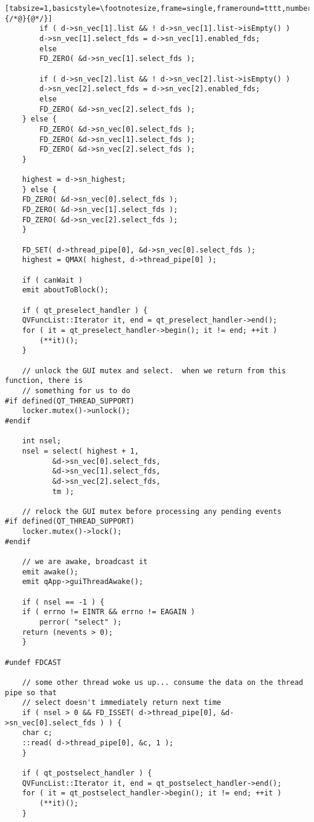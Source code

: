 \begin{enumerate}
\begin{lstlisting}[tabsize=1,basicstyle=\footnotesize,frame=single,frameround=tttt,numbers=left,breaklines=true,title=\$QTDIR/src/kernel/qeventloop\_{}qws.cpp,escapeinside={/*@}{@*/}]
	    if ( d->sn_vec[1].list && ! d->sn_vec[1].list->isEmpty() )
		d->sn_vec[1].select_fds = d->sn_vec[1].enabled_fds;
	    else
		FD_ZERO( &d->sn_vec[1].select_fds );

	    if ( d->sn_vec[2].list && ! d->sn_vec[2].list->isEmpty() )
		d->sn_vec[2].select_fds = d->sn_vec[2].enabled_fds;
	    else
		FD_ZERO( &d->sn_vec[2].select_fds );
	} else {
	    FD_ZERO( &d->sn_vec[0].select_fds );
	    FD_ZERO( &d->sn_vec[1].select_fds );
	    FD_ZERO( &d->sn_vec[2].select_fds );
	}

	highest = d->sn_highest;
    } else {
	FD_ZERO( &d->sn_vec[0].select_fds );
	FD_ZERO( &d->sn_vec[1].select_fds );
	FD_ZERO( &d->sn_vec[2].select_fds );
    }

    FD_SET( d->thread_pipe[0], &d->sn_vec[0].select_fds );
    highest = QMAX( highest, d->thread_pipe[0] );

    if ( canWait )
	emit aboutToBlock();

    if ( qt_preselect_handler ) {
	QVFuncList::Iterator it, end = qt_preselect_handler->end();
	for ( it = qt_preselect_handler->begin(); it != end; ++it )
	    (**it)();
    }

    // unlock the GUI mutex and select.  when we return from this function, there is
    // something for us to do
#if defined(QT_THREAD_SUPPORT)
    locker.mutex()->unlock();
#endif

    int nsel;
    nsel = select( highest + 1,
		   &d->sn_vec[0].select_fds,
		   &d->sn_vec[1].select_fds,
		   &d->sn_vec[2].select_fds,
		   tm );

    // relock the GUI mutex before processing any pending events
#if defined(QT_THREAD_SUPPORT)
    locker.mutex()->lock();
#endif

    // we are awake, broadcast it
    emit awake();
    emit qApp->guiThreadAwake();

    if ( nsel == -1 ) {
	if ( errno != EINTR && errno != EAGAIN )
	    perror( "select" );
	return (nevents > 0);
    }

#undef FDCAST

    // some other thread woke us up... consume the data on the thread pipe so that
    // select doesn't immediately return next time
    if ( nsel > 0 && FD_ISSET( d->thread_pipe[0], &d->sn_vec[0].select_fds ) ) {
	char c;
	::read( d->thread_pipe[0], &c, 1 );
    }

    if ( qt_postselect_handler ) {
	QVFuncList::Iterator it, end = qt_postselect_handler->end();
	for ( it = qt_postselect_handler->begin(); it != end; ++it )
	    (**it)();
    }


\end{lstlisting}
\end{enumerate}
